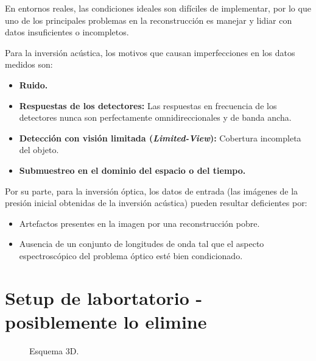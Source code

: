En entornos reales, las condiciones ideales son difíciles de implementar, por lo que uno de los principales problemas en la reconstrucción es manejar y lidiar con datos insuficientes o incompletos.

Para la inversión acústica, los motivos que causan imperfecciones en los datos medidos son:

\begin{itemize}
    \item \textbf{Ruido.}
    \item \textbf{Respuestas de los detectores:} Las respuestas en frecuencia de los detectores nunca son perfectamente omnidireccionales y de banda ancha.
    \item \textbf{Detección con visión limitada (\textit{Limited-View}):} Cobertura incompleta del objeto.
    \item \textbf{Submuestreo en el dominio del espacio o del tiempo.}
\end{itemize}

Por su parte, para la inversión óptica, los datos de entrada (las imágenes de la presión inicial obtenidas de la inversión acústica) pueden resultar deficientes por:

\begin{itemize}
    \item Artefactos presentes en la imagen por una reconstrucción pobre.
    \item Ausencia de un conjunto de longitudes de onda tal que el aspecto espectroscópico del problema óptico esté bien condicionado.
\end{itemize}



\section{Setup de labortatorio - posiblemente lo elimine}

\begin{figure}[H]
    \centering
    \resizebox{0.55\textwidth}{!}{%
    }%
    \caption{Esquema 3D.}
    \label{fig:TOA_3D_lab}
\end{figure}
